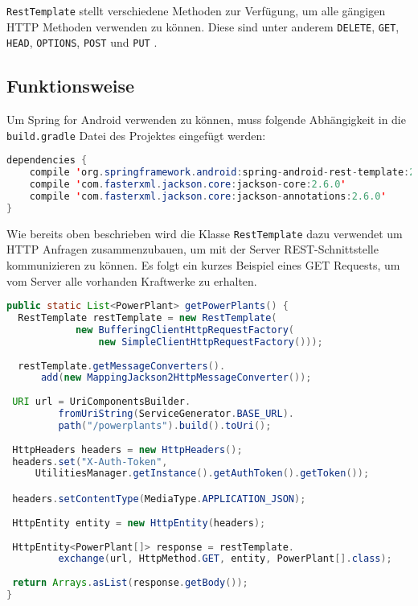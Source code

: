 \texttt{RestTemplate} stellt verschiedene Methoden zur Verfügung, um alle gängigen HTTP Methoden verwenden zu können. Diese sind unter anderem \texttt{DELETE}, \texttt{GET}, \texttt{HEAD}, \texttt{OPTIONS}, \texttt{POST} und \texttt{PUT} \cite{springDokuRestTemplate}.

\subsection{Funktionsweise}
Um Spring for Android verwenden zu können, muss folgende Abhängigkeit in die \texttt{build.gradle} Datei des Projektes eingefügt werden:

\begin{lstlisting}[language=java, numbers=none, frame=single, stringstyle=\color{mymauve}\scriptsize]
dependencies {
	compile 'org.springframework.android:spring-android-rest-template:2.0.0.M1'
	compile 'com.fasterxml.jackson.core:jackson-core:2.6.0'
	compile 'com.fasterxml.jackson.core:jackson-annotations:2.6.0'
}
\end{lstlisting}
\newpage
Wie bereits oben beschrieben wird die Klasse \texttt{RestTemplate} dazu verwendet um HTTP Anfragen zusammenzubauen, um mit der Server REST-Schnittstelle kommunizieren zu können. Es folgt ein kurzes Beispiel eines GET Requests, um vom Server alle vorhanden Kraftwerke zu erhalten.

\begin{lstlisting}[language=java, caption={GET Request um alle Kraftwerke zu erhalten},label=lst:getAllPowerPlants, frame=single, tabsize=3]
public static List<PowerPlant> getPowerPlants() {
  RestTemplate restTemplate = new RestTemplate(
			new BufferingClientHttpRequestFactory(
				new SimpleClientHttpRequestFactory()));
				  
  restTemplate.getMessageConverters().
	  add(new MappingJackson2HttpMessageConverter());
 
 URI url = UriComponentsBuilder.
		 fromUriString(ServiceGenerator.BASE_URL).
		 path("/powerplants").build().toUri();
 
 HttpHeaders headers = new HttpHeaders();
 headers.set("X-Auth-Token", 
	 UtilitiesManager.getInstance().getAuthToken().getToken());

 headers.setContentType(MediaType.APPLICATION_JSON);
 
 HttpEntity entity = new HttpEntity(headers);
 
 HttpEntity<PowerPlant[]> response = restTemplate.
		 exchange(url, HttpMethod.GET, entity, PowerPlant[].class);
 
 return Arrays.asList(response.getBody());
}
\end{lstlisting}


